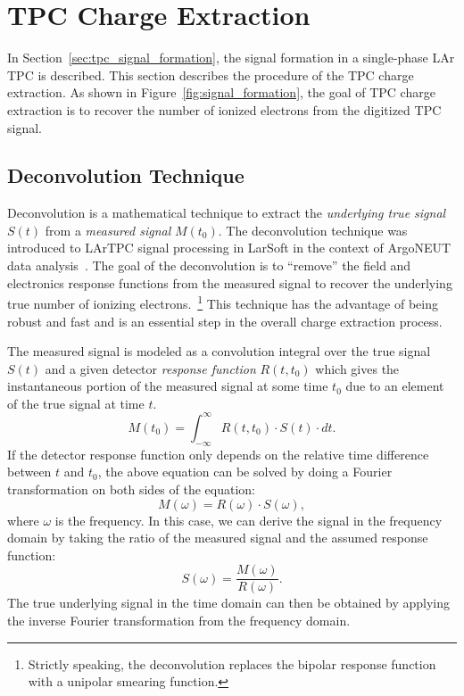 \section{TPC Charge Extraction}
\label{sec:tpc-signal-calibration}

In Section~\ref{sec:tpc_signal_formation}, the signal formation in a single-phase LAr TPC
is described. This section describes the procedure of the TPC 
charge extraction. As shown in Figure~\ref{fig:signal_formation}, the 
goal of TPC charge extraction is to recover the number of ionized 
electrons from the digitized TPC signal. 

\subsection{Deconvolution Technique}\label{sec:decon}
\label{sec:decon-tech}
Deconvolution is a mathematical technique to extract the \textit{underlying true signal}
$S(t)$ from a \textit{measured signal} $M(t_0)$. The deconvolution technique 
was introduced to LArTPC signal processing in LarSoft in the context of ArgoNEUT data analysis~\cite{bruce}. 
The goal of the deconvolution is 
to ``remove'' the field and electronics response functions from the measured 
signal to recover the underlying true number of ionizing electrons.~\footnote{Strictly speaking,
the deconvolution replaces the bipolar response function with a unipolar smearing
function.} This technique has the advantage of being robust and fast and is an 
essential step in the overall charge extraction process. 

The measured signal is modeled as a convolution integral over the true 
signal $S(t)$ and a given detector \textit{response function} $R(t,t_0)$ which gives the
instantaneous portion of the measured signal at some time $t_0$ due to
an element of the true signal at time $t$.
\begin{equation}\label{eq:decon_1}
M(t_0) = \int_{-\infty}^{\infty}  R(t,t_0) \cdot S(t) \cdot dt.
\end{equation}
If the detector response function only depends on the relative time 
difference between $t$ and $t_0$, the above equation can be solved by 
doing a Fourier transformation on both sides of the equation:
\begin{equation}
M(\omega) = R(\omega) \cdot S(\omega), 
\end{equation}
where $\omega$ is the frequency. In this case, we can derive the signal in the 
frequency domain by taking the ratio of the measured signal and the assumed
response function:
\begin{equation}\label{eq:decon_2}
S(\omega) = \frac{M(\omega)}{R(\omega)}.
\end{equation}
The true underlying signal in the time domain can then be obtained by applying the 
inverse Fourier transformation from the frequency domain. 

